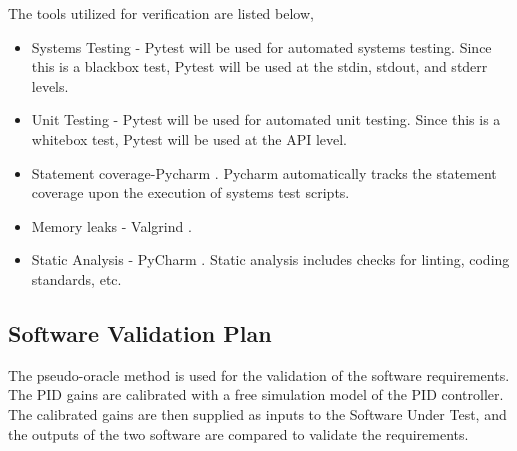 \documentclass[12pt, titlepage]{article}
\begin{document}

The tools utilized for verification are listed below,

\begin{itemize}
\item Systems Testing - Pytest \cite{Pytest} will be used for automated systems
testing. Since this  is a blackbox test, Pytest will be used at the stdin, stdout, and
stderr levels.

\item Unit Testing - Pytest \cite{Pytest} will be used for automated unit testing.
 Since this is a whitebox test, Pytest will be used at the API level.

\item Statement coverage-Pycharm \cite{Pycharm}. Pycharm automatically tracks
 the statement coverage upon the execution of systems test scripts.

\item Memory leaks - Valgrind \cite{Valgrind}.

\item Static Analysis - PyCharm \cite{Pycharm}. Static analysis includes checks for linting,
coding standards, etc.

\end{itemize}

\subsection{Software Validation Plan}


The pseudo-oracle method is used for the validation of the software requirements.
The PID gains are calibrated with a free simulation model \cite{Free_PID} of the 
PID controller. The calibrated gains are then supplied as inputs to the Software 
Under Test, and the outputs of the two software are compared to validate 
the requirements.
\end{document}
